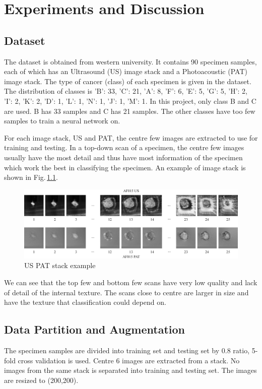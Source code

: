 \chapter{Experiments and Discussion} 

\section{Dataset}
The dataset is obtained from western university. It contains 90 specimen samples, each of which has an Ultrasound (US) image stack and a Photoacoustic (PAT) image stack. The type of cancer (class) of each specimen is given in the dataset. The distribution of classes is 
{'B': 33, 'C': 21, 'A': 8, 'F': 6, 'E': 5, 'G': 5, 'H': 2, 'I': 2, 'K': 2, 'D': 1, 'L': 1, 'N': 1, 'J': 1, 'M': 1}.  
In this project, only class B and C are used. B has 33 samples and C has 21 samples. The other classes have too few samples to train a neural network on. 

For each image stack, US and PAT, the centre few images are extracted to use for training and testing. In a top-down scan of a specimen, the centre few images usually have the most detail and thus have most information of the specimen which work the best in classifying the specimen. An example of image stack is shown in Fig.\,\ref{stack}.

\begin{figure}[h]
	\centering
	\includegraphics[width=\textwidth]{Figs/stack.jpg}
    \caption{US PAT stack example}
    \label{stack}
\end{figure}

We can see that the top few and bottom few scans have very low quality and lack of detail of the internal texture. The scans close to centre are larger in size and have the texture that classification could depend on.


\section{Data Partition and Augmentation}
The specimen samples are divided into training set and testing set by 0.8 ratio, 5-fold cross validation is used. Centre 6 images are extracted from a stack. No images from the same stack is separated into training and testing set. The images are resized to (200,200).

